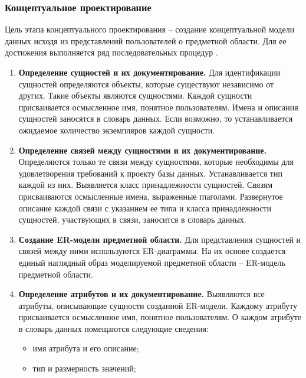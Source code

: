 \subsubsection{Концептуальное проектирование}

Цель этапа концептуального проектирования – создание концептуальной модели данных исходя из представлений
пользователей о предметной области. Для ее достижения выполняется ряд последовательных процедур \autocite{design-db_6}.
\begin{enumerate}
    \item \textbf{Определение сущностей и их документирование.}
        Для идентификации сущностей определяются объекты, которые существуют независимо от других. Такие объекты
        являются сущностями. Каждой сущности присваивается осмысленное имя, понятное пользователям. Имена и
        описания сущностей заносятся в словарь данных. Если возможно, то устанавливается ожидаемое количество
        экземпляров каждой сущности.

    \item \textbf{Определение связей между сущностями и их документирование.}
        Определяются только те связи между сущностями, которые необходимы для удовлетворения требований к проекту
        базы данных. Устанавливается тип каждой из них. Выявляется класс принадлежности сущностей. Связям
        присваиваются осмысленные имена, выраженные глаголами. Развернутое описание каждой связи с указанием ее
        типа и класса принадлежности сущностей, участвующих в связи, заносится в словарь данных.

    \item \textbf{Создание ER-модели предметной области.}
        Для представления сущностей и связей между ними используются ER-диаграммы. На их основе создается единый
        наглядный образ моделируемой предметной области – ER-модель предметной области.

    \item \textbf{Определение атрибутов и их документирование.}
        Выявляются все атрибуты, описывающие сущности созданной ER-модели. Каждому атрибуту присваивается осмысленное
        имя, понятное пользователям. О каждом атрибуте в словарь данных помещаются следующие сведения:
        \begin{itemize}
            \item имя атрибута и его описание;

            \item тип и размерность значений;


\end{itemize}
\end{enumerate}
